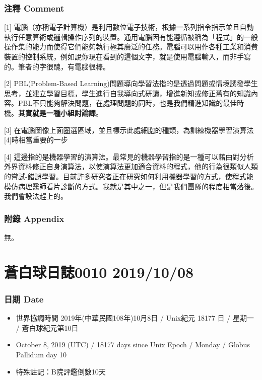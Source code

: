\documentclass[a5paper, 12pt
]{book}
\providecommand{\tightlist}{%
  \setlength{\itemsep}{0pt}\setlength{\parskip}{0pt}}
\begin{document}
\hypertarget{ux6ce8ux91cb-comment-2}{%
\subsubsection{注釋 Comment}\label{ux6ce8ux91cb-comment-2}}

{[}1{]}
電腦（亦稱電子計算機）是利用數位電子技術，根據一系列指令指示並且自動執行任意算術或邏輯操作序列的裝置。通用電腦因有能遵循被稱為「程式」的一般操作集的能力而使得它們能夠執行極其廣泛的任務。電腦可以用作各種工業和消費裝置的控制系統，例如說你現在看到的這個文字，就是使用電腦輸入，而非手寫的。筆者的字很醜，有電腦很棒。

{[}2{]} PBL(Problem-Based
Learning)問題導向學習法指的是透過問題或情境誘發學生思考，並建立學習目標，學生進行自我導向式研讀，增進新知或修正舊有的知識內容。PBL不只能夠解決問題，在處理問題的同時，也是我們精進知識的最佳時機。\textbf{其實就是一種小組討論課}。

{[}3{]}
在電腦圖像上面圈選區域，並且標示此處細胞的種類，為訓練機器學習演算法{[}4{]}時相當重要的一步

{[}4{]}
這邊指的是機器學習的演算法。最常見的機器學習指的是一種可以藉由對分析外界資料修正自身演算法，以使演算法更加適合資料的程式，他的行為很類似人類的嘗試-錯誤學習。目前許多研究者正在研究如何利用機器學習的方式，使程式能模仿病理醫師看片診斷的方式。我就是其中之一，但是我們團隊的程度相當落後。我們會設法趕上的。

\hypertarget{ux9644ux9304-appendix-2}{%
\subsubsection{附錄 Appendix}\label{ux9644ux9304-appendix-2}}

無。

\hypertarget{ux84bcux767dux7403ux65e5ux8a8c0010-20191008}{%
\section{蒼白球日誌0010
2019/10/08}\label{ux84bcux767dux7403ux65e5ux8a8c0010-20191008}}

\hypertarget{ux65e5ux671f-date-9}{%
\subsubsection{日期 Date}\label{ux65e5ux671f-date-9}}

\begin{itemize}
\tightlist
\item
  世界協調時間 2019年(中華民國108年)10月8日 / Unix紀元 18177 日 / 星期一
  / 蒼白球紀元第10日
\item
  October 8, 2019 (UTC) / 18177 days since Unix Epoch / Monday / Globus
  Pallidum day 10
\item
  特殊註記：B院評鑑倒數10天
\end{itemize}
\end{document}
